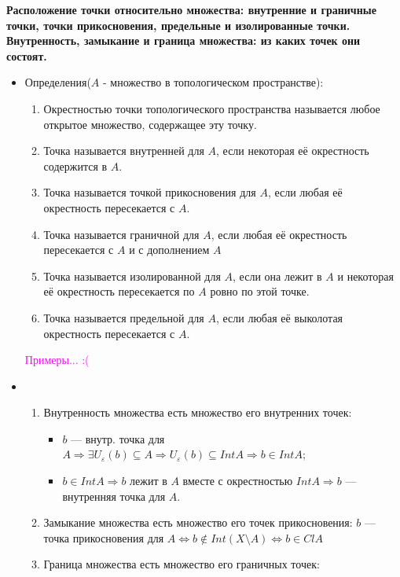 \documentclass[a4paper,100pt]{article}
\theoremstyle{indented}
\begin{document}
\textbf{ Расположение точки относительно множества: внутренние и граничные точки, точки прикосновения, предельные и изолированные точки. Внутренность, замыкание и граница множества: из каких точек они состоят.}
\begin{itemize}
    \item Определения($A$ - множество в топологическом пространстве):
    \begin{enumerate}
        \item Окрестностью точки топологического пространства называется любое открытое множество, содержащее эту точку.
        \item Точка называется внутренней для $A$, если некоторая её окрестность содержится в $A$.
        \item Точка называется точкой прикосновения для $A$, если любая её окрестность пересекается с $A$.
        \item Точка называется граничной для $A$, если любая её окрестность пересекается с $A$ и с дополнением $A$
        \item Точка называется изолированной для $A$, если она лежит в $A$ и некоторая её окрестность пересекается по $A$ ровно по этой точке.
        \item Точка называется предельной для $A$, если любая её выколотая окрестность пересекается с $A$.
    \end{enumerate}
    \textcolor{magenta}{Примеры... :(}
    
    \item 
    \begin{enumerate}
        \item Внутренность множества есть множество его внутренних точек:
            \begin{itemize}
                \item $b$ --- внутр. точка для $A \Rightarrow \exists U_\varepsilon(b) \subseteq A \Rightarrow U_\varepsilon(b) \subseteq Int A  \Rightarrow b \in IntA$;
                \item $b \in Int A \Rightarrow b \text{ лежит в $A$ вместе с окрестностью } IntA \Rightarrow b$ --- внутренняя точка для $A$. 
            \end{itemize}
        \item Замыкание множества есть множество его точек прикосновения:
                $b$ --- точка прикосновения для $A \iff b \notin Int(X \setminus A) \iff b \in ClA$
        \item Граница множества есть множество его граничных точек:
        

\end{enumerate}
\end{itemize}
\end{document}

